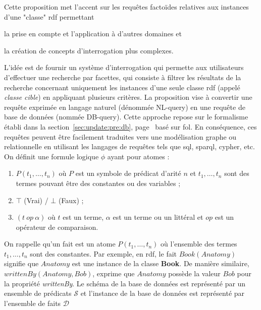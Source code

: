 Cette proposition met l'accent sur les requêtes factoïdes relatives aux instances d'une "classe" \gls{rdf} permettant
\begin{enumerate*}[label=(\roman*)]
    \item la prise en compte et l'application à d'autres domaines et
    \item la création de concepts d'interrogation plus complexes.
\end{enumerate*}
L'idée est de fournir un système d'interrogation qui permette aux utilisateurs d'effectuer une recherche par facettes, qui consiste à filtrer les résultats de la recherche concernant uniquement les instances d'une seule classe \gls{rdf} (appelé \emph{classe cible}) en appliquant plusieurs critères.
La proposition vise à convertir une requête exprimée en langage naturel (dénommée NL-query) en une requête de base de données (nommée DB-query).
Cette approche repose sur le formalisme établi dans la section~\ref{sec:update:pre:db}, page~\pageref{sec:update:pre:db} basé sur \gls{fol}.
En conséquence, ces requêtes peuvent être facilement traduites vers une modélisation graphe ou relationnelle en utilisant les langages de requêtes tels que \gls{sql}, \gls{sparql}, \gls{cypher}, etc.
On définit une formule logique $\phi$ ayant pour atomes :
\begin{enumerate}
    \item $P(t_1, \dots, t_n)$ où $P$ est un symbole de prédicat d'arité $n$ et $t_1, \dots, t_n$ sont des termes pouvant être des constantes ou des variables ;
    \item $\top$ (Vrai) / $\bot$ (Faux) ;
    \item $(t\ op\ \alpha)$ où $t$ est un terme, $\alpha$ est un terme ou un littéral et $op$ est un opérateur de comparaison.
\end{enumerate}
On rappelle qu'un fait est un atome $P(t_1, \dots, t_n)$ où l'ensemble des termes $t_1, \dots, t_n$ sont des constantes.
Par exemple, en \gls{rdf}, le fait $Book(Anatomy)$ signifie que $Anatomy$ est une instance de la classe \textbf{Book}.
De manière similaire, $writtenBy(Anatomy, Bob)$, exprime que $Anatomy$ possède la valeur $Bob$ pour la propriété \textit{writtenBy}.
Le schéma de la base de données est représenté par un ensemble de prédicats $\mathcal{S}$ et l'instance de la base de données est représenté par l'ensemble de faits $\mathcal{D}$

